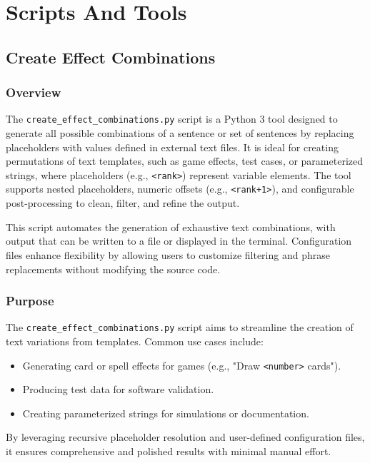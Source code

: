 \chapter{Scripts And Tools}






\section{Create Effect Combinations}
\subsection{Overview}
The \texttt{create\_effect\_combinations.py} script is a Python 3 tool designed to generate all possible combinations of a sentence or set of sentences by replacing placeholders with values defined in external text files. It is ideal for creating permutations of text templates, such as game effects, test cases, or parameterized strings, where placeholders (e.g., \texttt{<rank>}) represent variable elements. The tool supports nested placeholders, numeric offsets (e.g., \texttt{<rank+1>}), and configurable post-processing to clean, filter, and refine the output.

This script automates the generation of exhaustive text combinations, with output that can be written to a file or displayed in the terminal. Configuration files enhance flexibility by allowing users to customize filtering and phrase replacements without modifying the source code.

\subsection{Purpose}
The \texttt{create\_effect\_combinations.py} script aims to streamline the creation of text variations from templates. Common use cases include:
\begin{itemize}
    \item Generating card or spell effects for games (e.g., "Draw \texttt{<number>} cards").
    \item Producing test data for software validation.
    \item Creating parameterized strings for simulations or documentation.
\end{itemize}
By leveraging recursive placeholder resolution and user-defined configuration files, it ensures comprehensive and polished results with minimal manual effort.

